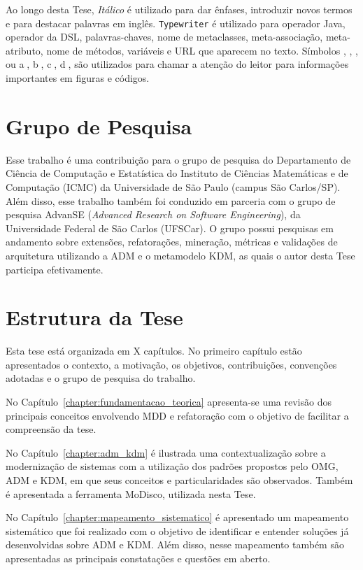 Ao longo desta Tese, \textit{Itálico} é utilizado para dar ênfases, introduzir novos termos e para destacar palavras em inglês. \texttt{Typewriter} é utilizado para operador Java, operador da DSL, palavras-chaves, nome de metaclasses, meta-associação, meta-atributo, nome de métodos, variáveis e URL que aparecem no texto. Símbolos , , ,  ou \textcircled{a}, \textcircled{b}, \textcircled{c}, \textcircled{d}, são utilizados para chamar a atenção do leitor para informações importantes em figuras e códigos.

\section{Grupo de Pesquisa}

Esse trabalho é uma contribuição para o grupo de pesquisa do Departamento de Ciência de Computação e Estatística do Instituto de Ciências Matemáticas e de Computação (ICMC) da Universidade de São Paulo (campus São Carlos/SP). Além disso, esse trabalho também foi conduzido em parceria com o grupo de pesquisa AdvanSE (\textit{Advanced Research on Software Engineering}), da Universidade Federal de São Carlos (UFSCar). O grupo possui pesquisas em andamento sobre extensões, refatorações, mineração, métricas e validações de arquitetura utilizando a ADM e o metamodelo KDM, as quais o autor desta Tese participa efetivamente.

\section{Estrutura da Tese}

Esta tese está organizada em X capítulos. No primeiro capítulo estão apresentados o contexto, a motivação, os objetivos, contribuições, convenções adotadas e o grupo de pesquisa do trabalho. 

No Capítulo~\ref{chapter:fundamentacao_teorica} apresenta-se uma revisão dos principais conceitos envolvendo MDD e refatoração com o objetivo de facilitar a compreensão da tese.

No Capítulo~\ref{chapter:adm_kdm} é ilustrada uma contextualização sobre a modernização de sistemas com a utilização dos padrões propostos pelo OMG, ADM e KDM, em que seus conceitos e particularidades são observados. Também é apresentada a ferramenta MoDisco, utilizada nesta Tese. 

No Capítulo~\ref{chapter:mapeamento_sistematico} é apresentado um mapeamento sistemático que foi realizado com o objetivo de identificar e entender soluções já desenvolvidas sobre ADM e KDM. Além disso, nesse mapeamento também são apresentadas as principais constatações e questões em aberto.


